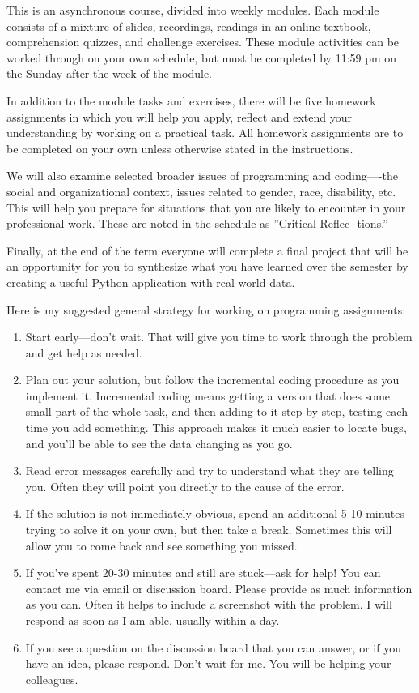 \documentclass[11pt]{article}
\begin{document}
This is an asynchronous course, divided into weekly modules. Each module consists of a mixture of slides, recordings, readings in an online textbook, comprehension quizzes, and challenge exercises. These module activities can be worked through on your own schedule, but must be completed by 11:59 pm on the Sunday after the week of the module.

In addition to the module tasks and exercises, there will be five homework assignments in which you will help you apply, reflect and extend your understanding by working on a practical task. All homework assignments are to be completed on your own unless otherwise stated in the instructions.

We will also examine selected broader issues of programming and coding—-the social and organizational context, issues related to gender, race, disability, etc. This will help you prepare for situations that you are likely to encounter in your professional work. These are noted in the schedule as ”Critical Reflec- tions.”

Finally, at the end of the term everyone will complete a final project that will be an opportunity for you to synthesize what you have learned over the semester by creating a useful Python application with real-world data.

Here is my suggested general strategy for working on programming assignments:

\begin{enumerate}
	\item Start early—don’t wait. That will give you time to work through the problem and get help as needed.
	\item Plan out your solution, but follow the incremental coding procedure as you implement it. Incremental coding means getting a version that does some small part of the whole task, and then adding to it step by step, testing each time you add something. This approach makes it much easier to locate bugs, and you’ll be able to see the data changing as you go.
	\item Read error messages carefully and try to understand what they are telling you. Often they will point you directly to the cause of the error.
	\item If the solution is not immediately obvious, spend an additional 5-10 minutes trying to solve it on your own, but then take a break. Sometimes this will allow you to come back and see something you missed.
	\item If you’ve spent 20-30 minutes and still are stuck—ask for help! You can contact me via email or discussion board. Please provide as much information as you can. Often it helps to include a screenshot with the problem. I will respond as soon as I am able, usually within a day.
	\item If you see a question on the discussion board that you can answer, or if you have an idea, please respond. Don’t wait for me. You will be helping your colleagues.
\end{enumerate}
\end{document}
